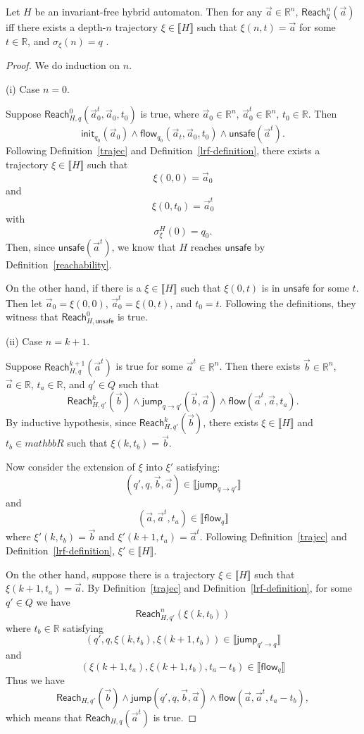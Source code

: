 \documentclass[envcountsect]{llncs}
\newcommand{\flow}{\mathsf{flow}}
\newcommand{\jump}{\mathsf{jump}}
\newcommand{\init}{\mathsf{init}}
\newcommand{\reach}{\mathsf{Reach}}
\newcommand{\unsafe}{\mathsf{unsafe}}
\begin{document}
\begin{proposition}
Let $H$ be an invariant-free hybrid automaton. Then for any $\vec a\in
\mathbb{R}^n$, $\reach^n_q(\vec a)$ iff there exists a depth-$n$ trajectory
$\xi\in\llbracket H\rrbracket$ such that $\xi(n, t) = \vec a$ for some
$t\in\mathbb{R}$, and $\sigma_{\xi}(n) = q$ .
\end{proposition}


\begin{proof}
We do induction on $n$.

(i) Case $n=0$.

Suppose $\reach^0_{H,q}(\vec a_0^t, \vec a_0, t_0)$ is true, where $\vec a_0\in
\mathbb{R}^n$, $\vec a_0^t\in \mathbb{R}^n$, $t_0\in \mathbb{R}$. Then
$$\init_{q_0}(\vec a_0)\wedge\flow_{q_0}(\vec a_t, \vec a_0, t_0) \wedge
\unsafe(\vec a^t).$$
Following Definition~\ref{trajec} and Definition~\ref{lrf-definition}, there
exists a trajectory $\xi\in \llbracket H\rrbracket$ such that
$$\xi(0,0) = \vec a_0$$
and
$$\xi(0,t_0) = \vec a_0^t$$
with
$$\sigma^H_{\xi}(0) = q_0.$$
Then, since $\unsafe(\vec a^t)$, we know that $H$ reaches $\unsafe$ by
Definition~\ref{reachability}.

On the other hand, if there is a $\xi\in \llbracket H\rrbracket$ such that
$\xi(0,t)$ is in $\unsafe$ for some $t$. Then let $\vec a_0 = \xi(0,0)$, $\vec
a_0^t = \xi(0,t)$, and $t_0 = t$. Following the definitions, they witness that
$\reach^0_{H,\unsafe}$ is true.

(ii) Case $n=k+1$.

Suppose $\reach_{H,q}^{k+1}(\vec a^t)$ is true for some $\vec
a^t\in\mathbb{R}^n$. Then there exists $\vec b\in \mathbb{R}^n$, $\vec a\in
\mathbb{R}$, $t_a\in \mathbb{R}$, and $q'\in Q$ such that
$$\reach_{H,q'}^k(\vec b) \wedge \jump_{q\rightarrow q'}(\vec b, \vec a)\wedge
\flow(\vec a^t, \vec a, t_a).$$
By inductive hypothesis, since $\reach_{H,q'}^k(\vec b)$, there exists
$\xi\in\llbracket H\rrbracket$ and $t_b\in mathbb{R}$ such that $\xi(k, t_b) =
\vec b$.


Now consider the extension of $\xi$ into $\xi'$ satisfying:
$$(q', q, \vec b, \vec a)\in \llbracket \jump_{q\rightarrow q'}\rrbracket$$
and
$$(\vec a, \vec a^t, t_a)\in \llbracket \flow_q \rrbracket$$
where $\xi'(k,t_b) = \vec b$ and $\xi'(k+1, t_a) = \vec a^t$. Following
Definition~\ref{trajec} and Definition~\ref{lrf-definition}, $\xi'\in \llbracket
H\rrbracket$.

On the other hand, suppose there is a trajectory $\xi\in\llbracket H\rrbracket$
such that $\xi(k+1, t_a) = \vec a$. By Definition~\ref{trajec} and
Definition~\ref{lrf-definition}, for some $q'\in Q$ we have
$$\reach^n_{H,q'}(\xi(k,t_b))$$
where $t_b\in\mathbb{R}$ satisfying
$$(q', q, \xi(k,t_b), \xi(k+1,t_b))\in \llbracket \jump_{q'\rightarrow q}
\rrbracket$$
and
$$(\xi(k+1,t_a), \xi(k+1,t_b), t_a - t_b)\in \llbracket \flow_q\rrbracket$$
Thus we have
$$\reach_{H,q'}(\vec b)\wedge \jump(q',q,\vec b, \vec a)\wedge \flow(\vec a,
\vec a^t, t_a-t_b),$$
which means that $\reach_{H,q}(\vec a^t)$ is true.
\end{proof}
\end{document}
